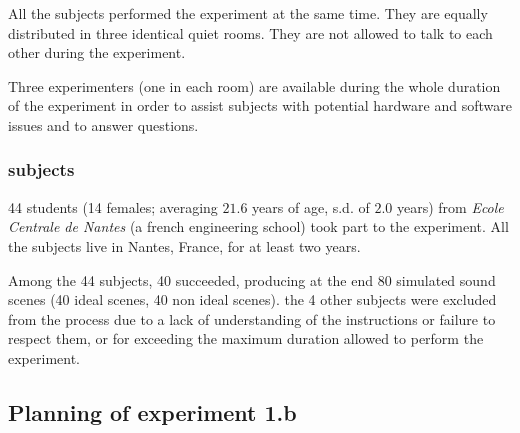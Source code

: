 \documentclass[12pt]{elsarticle}
\begin{document}

All the subjects performed the experiment at the same time. They are equally distributed in three identical quiet rooms. They are not allowed to talk to each other during the experiment.


Three experimenters (one in each room) are available during the whole duration of the experiment in order to assist subjects with potential hardware and software issues and to answer questions.

\subsubsection*{subjects}


44 students (14 females; averaging $21.6$ years of age, s.d. of $2.0$ years) from \emph{Ecole Centrale de Nantes} (a french engineering school) took part to the experiment. All the subjects live in Nantes, France, for at least two years.


Among the 44 subjects, 40 succeeded, producing at the end 80 simulated sound scenes (40 ideal scenes, 40 non ideal scenes). the 4 other subjects were excluded from the process due to a lack of understanding of the instructions or failure to respect them, or for exceeding the maximum duration allowed to perform the experiment.

\subsection{Planning of experiment 1.b}
\label{sec:xp1b_plan}
\end{document}

